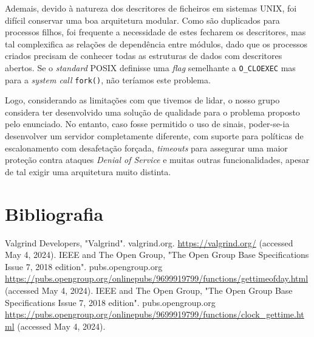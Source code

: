\documentclass[11pt]{article}
\begin{document}
Ademais, devido à natureza dos descritores de ficheiros em sistemas UNIX, foi difícil conservar uma
boa arquitetura modular. Como são duplicados para processos filhos, foi frequente a necessidade de
estes fecharem os descritores, mas tal complexifica as relações de dependência entre módulos, dado
que os processos criados precisam de conhecer todas as estruturas de dados com descritores abertos.
Se o \emph{standard} POSIX definisse uma \emph{flag} semelhante a \texttt{O\_CLOEXEC} mas para a
\emph{system call} \texttt{fork()}, não teríamos este problema.

Logo, considerando as limitações com que tivemos de lidar, o nosso grupo considera ter desenvolvido
uma solução de qualidade para o problema proposto pelo enunciado. No entanto, caso fosse permitido o
uso de sinais, poder-se-ia desenvolver um servidor completamente diferente, com suporte para
políticas de escalonamento com desafetação forçada, \emph{timeouts} para assegurar uma maior
proteção contra ataques \emph{Denial of Service} e muitas outras funcionalidades, apesar de tal
exigir uma arquitetura muito distinta.

\section{Bibliografia}
\def\refname{}
\vspace{-1.5cm}
\begin{thebibliography}{9}
         Valgrind Developers, "Valgrind". valgrind.org.
         \url{https://valgrind.org/}
         (accessed May 4, 2024).
        IEEE and The Open Group, "The Open Group Base Specifications Issue 7, 2018 edition".
        pubs.opengroup.org
        \url{https://pubs.opengroup.org/onlinepubs/9699919799/functions/gettimeofday.html}
        (accessed May 4, 2024).
        IEEE and The Open Group, "The Open Group Base Specifications Issue 7, 2018 edition".
        pubs.opengroup.org
        \url{https://pubs.opengroup.org/onlinepubs/9699919799/functions/clock_gettime.html}
        (accessed May 4, 2024).
\end{thebibliography}
\end{document}
